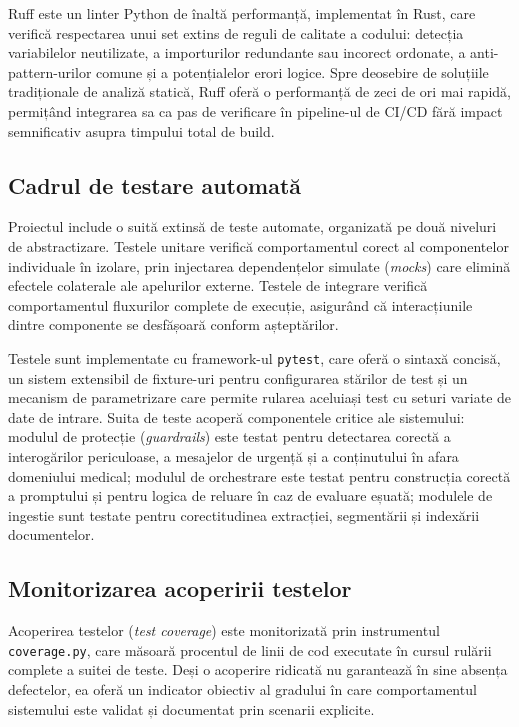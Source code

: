 \documentclass[12pt, a4paper, oneside, romanian]{teza-upb}
\begin{document}
Ruff este un linter Python de înaltă performanță, implementat în Rust, care verifică respectarea unui set extins de reguli de calitate a codului: detecția variabilelor neutilizate, a importurilor redundante sau incorect ordonate, a anti-pattern-urilor comune și a potențialelor erori logice. Spre deosebire de soluțiile tradiționale de analiză statică, Ruff oferă o performanță de zeci de ori mai rapidă, permițând integrarea sa ca pas de verificare în pipeline-ul de CI/CD fără impact semnificativ asupra timpului total de build.

\subsection{Cadrul de testare automată}

Proiectul include o suită extinsă de teste automate, organizată pe două niveluri de abstractizare. Testele unitare verifică comportamentul corect al componentelor individuale în izolare, prin injectarea dependențelor simulate (\textit{mocks}) care elimină efectele colaterale ale apelurilor externe. Testele de integrare verifică comportamentul fluxurilor complete de execuție, asigurând că interacțiunile dintre componente se desfășoară conform așteptărilor.

Testele sunt implementate cu framework-ul \texttt{pytest}, care oferă o sintaxă concisă, un sistem extensibil de fixture-uri pentru configurarea stărilor de test și un mecanism de parametrizare care permite rularea aceluiași test cu seturi variate de date de intrare. Suita de teste acoperă componentele critice ale sistemului: modulul de protecție (\textit{guardrails}) este testat pentru detectarea corectă a interogărilor periculoase, a mesajelor de urgență și a conținutului în afara domeniului medical; modulul de orchestrare este testat pentru construcția corectă a promptului și pentru logica de reluare în caz de evaluare eșuată; modulele de ingestie sunt testate pentru corectitudinea extracției, segmentării și indexării documentelor.

\subsection{Monitorizarea acoperirii testelor}

Acoperirea testelor (\textit{test coverage}) este monitorizată prin instrumentul \texttt{coverage.py}, care măsoară procentul de linii de cod executate în cursul rulării complete a suitei de teste. Deși o acoperire ridicată nu garantează în sine absența defectelor, ea oferă un indicator obiectiv al gradului în care comportamentul sistemului este validat și documentat prin scenarii explicite.
\end{document}

